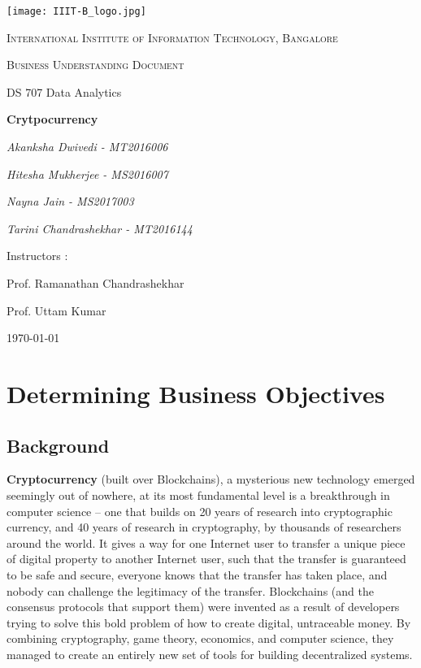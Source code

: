 \documentclass{article}
\begin{document}
\begin{titlepage}
	\centering
	\texttt{[image: IIIT-B\_logo.jpg]}\par\vspace{1cm}
	{\scshape\LARGE International Institute of Information Technology, Bangalore \par}
	\vspace{1cm}
	{\scshape\Large Business Understanding Document\par}
	{\Large DS 707 Data Analytics\par}
	\vspace{1.5cm}
	{\huge\bfseries Crytpocurrency\par}
	\vspace{2cm}
	{\Large\itshape Akanksha Dwivedi - MT2016006\par}
	{\Large\itshape Hitesha Mukherjee - MS2016007\par}
	{\Large\itshape Nayna Jain - MS2017003\par}
	{\Large\itshape Tarini Chandrashekhar - MT2016144\par}
	\vfill
	Instructors : \par
	Prof. Ramanathan Chandrashekhar
	\par
	Prof. Uttam Kumar

	\vfill

	{\large \today\par}
\end{titlepage}

\newpage

\tableofcontents


\newpage
\justify
\section{Determining Business Objectives}
\subsection{Background}
\textbf{Cryptocurrency} (built over Blockchains), a mysterious new technology emerged seemingly out of nowhere, at its most fundamental level is a breakthrough in computer science – one that builds on 20 years of research into cryptographic currency, and 40 years of research in cryptography, by thousands of researchers around the world. It gives a way for one Internet user to transfer a unique piece of digital property to another Internet user, such that the transfer is guaranteed to be safe and secure, everyone knows that the transfer has taken place, and nobody can challenge the legitimacy of the transfer.
\newline
Blockchains (and the consensus protocols that support them) were invented as a result of developers trying to solve this bold problem of how to create digital, untraceable money. By combining cryptography, game theory, economics, and computer science, they managed to create an entirely new set of tools for building decentralized systems.
\end{document}
